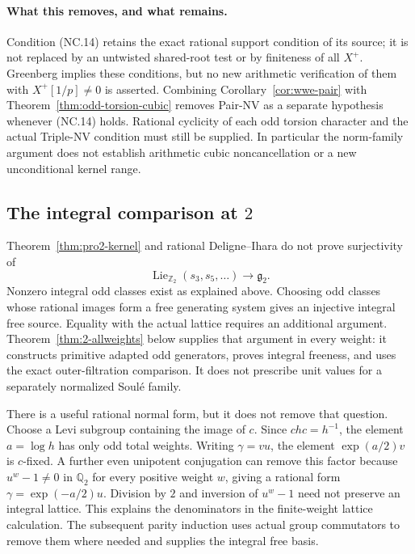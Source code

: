\documentclass[11pt,a4paper]{article}
\theoremstyle{definition}
\begin{document}
\paragraph{What this removes, and what remains.}
Condition (NC.14) retains the exact rational support condition
of its source; it is not replaced by an untwisted shared-root
test or by finiteness of all \(X^+\).
Greenberg implies these conditions, but no new arithmetic
verification of them with \(X^+[1/p]\ne0\) is asserted.
Combining Corollary~\ref{cor:wwe-pair} with
Theorem~\ref{thm:odd-torsion-cubic} removes Pair-NV as a separate
hypothesis whenever (NC.14) holds.  Rational cyclicity of each
odd torsion character and the actual Triple-NV condition must
still be supplied.  In particular the norm-family argument
does not establish arithmetic cubic noncancellation or a new
unconditional kernel range.

\subsection{The integral comparison at \texorpdfstring{$2$}{2}}

Theorem~\ref{thm:pro2-kernel} and rational Deligne--Ihara do not prove surjectivity of
\[
 \operatorname{Lie}_{\mathbb Z_2}(s_3,s_5,\ldots)
      \longrightarrow\mathfrak g_2.
\]
Nonzero integral odd classes exist as explained above. Choosing odd classes whose rational images form a free generating system gives an injective integral free source. Equality with the actual lattice requires an additional argument. Theorem~\ref{thm:2-allweights} below supplies that argument in every weight: it constructs primitive adapted odd generators, proves integral freeness, and uses the exact outer-filtration comparison. It does not prescribe unit values for a separately normalized Soul\'e family.

There is a useful rational normal form, but it does not remove that question. Choose a Levi subgroup containing the image of $c$. Since $chc=h^{-1}$, the element $a=\log h$ has only odd total weights. Writing $\gamma=vu$, the element $\exp(a/2)v$ is $c$-fixed. A further even unipotent conjugation can remove this factor because $u^w-1\neq0$ in $\mathbb Q_2$ for every positive weight $w$, giving a rational form $\gamma=\exp(-a/2)u$. Division by $2$ and inversion of $u^w-1$ need not preserve an integral lattice. This explains the denominators in the finite-weight lattice calculation. The subsequent parity induction uses actual group commutators to remove them where needed and supplies the integral free basis.
\end{document}
